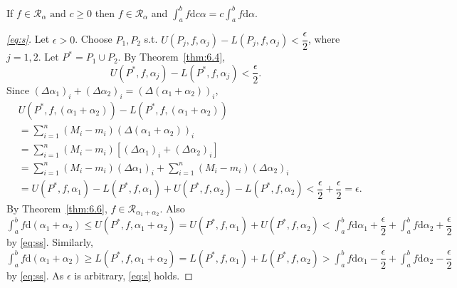 \begin{thm}[12]
\begin{enumerate}
		      If $f \in \mathscr{R}_{\alpha} \text{ and }  c\ge 0$ then $f \in \mathscr{R}_{\alpha}$ and
		      $\int_{a}^{b}{f\mathrm{d}c \alpha}= c \int_{a}^{b}{f\mathrm{d}\alpha}$.
		      \begin{proof}[\ref{eq:s}]
			      Let $\epsilon>0$. Choose $P_1,P_2$ s.t. $U(P_{j},f,\alpha_j)-L(P_{j},f,\alpha_j)<\dfrac{\epsilon}{2}$, where $j=1,2$.
			      Let $P^{*}=P_1 \cup P_2$. By Theorem~\ref{thm:6.4},
			      \begin{equation*}
				      U(P^{*},f,\alpha_j)-L(P^{*},f,\alpha_j)<\dfrac{\epsilon}{2} \label{eq:ss}\tag{**}
				      .
			      \end{equation*}
			      Since $(\Delta \alpha_1)_i+(\Delta \alpha_2)_i=(\Delta(\alpha_1+\alpha_2))_i$,
			      \begin{align*}
				       & U(P^{*},f,(\alpha_1+\alpha_2))-L(P^{*},f,(\alpha_1+\alpha_2))                                                                     \\
				       & =\sum_{i=1}^{n}{(M_i-m_i)(\Delta(\alpha_1+\alpha_2))_i}                                                                           \\
				       & =\sum_{i=1}^{n}{(M_i-m_i)[(\Delta \alpha_1)_i+(\Delta \alpha_2)_i]}                                                               \\
				       & =\sum_{i=1}^{n}{(M_i-m_i)(\Delta \alpha_1)_i}+\sum_{i=1}^{n}{(M_i-m_i)(\Delta \alpha_2)_i}                                        \\
				       & =U(P^{*},f,\alpha_1)-L(P^{*},f,\alpha_1)+U(P^{*},f,\alpha_2)-L(P^{*},f,\alpha_2)<\dfrac{\epsilon}{2}+\dfrac{\epsilon}{2}=\epsilon
				      .\end{align*}
			      By Theorem~\ref{thm:6.6}, $f \in \mathscr{R}_{\alpha_1+\alpha_2}$.
			      Also $\int_{a}^{b}{f\mathrm{d}(\alpha_1+\alpha_2)}\le U(P^{*},f,\alpha_1+\alpha_2)=U(P^{*},f,\alpha_1)+U(P^{*},f,\alpha_2)<\int_{a}^{b}{f\mathrm{d}\alpha_1}+\dfrac{\epsilon}{2}+\int_{a}^{b}{f\mathrm{d}\alpha_2}+\dfrac{\epsilon}{2}$ by \eqref{eq:ss}.
			      Similarly, $\int_{a}^{b}{f\mathrm{d}(\alpha_1+\alpha_2)}\ge L(P^{*},f,\alpha_1+\alpha_2)=L(P^{*},f,\alpha_1)+L(P^{*},f,\alpha_2)>\int_{a}^{b}{f\mathrm{d}\alpha_1}-\dfrac{\epsilon}{2}+\int_{a}^{b}{f\mathrm{d}\alpha_2}-\dfrac{\epsilon}{2}$ by \eqref{eq:ss}. As $\epsilon$ is arbitrary, \eqref{eq:s} holds.
		      \end{proof}
	\end{enumerate}
\end{thm}

